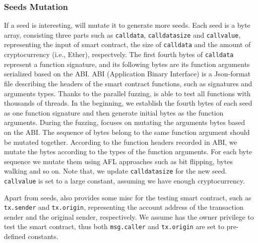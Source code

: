 \subsubsection{Seeds Mutation}
\label{design:mutation}
If a seed is interesting, {\runner} will mutate it to generate more seeds. 
Each seed is a byte array, consisting three parts such as \texttt{calldata}, \texttt{calldatasize} and \texttt{callvalue}, representing the input of smart contract, the size of \texttt{calldata} and the amount of cryptocurrency (i.e., Ether), respectvely.  
%
The first fourth bytes of \texttt{calldata} represent a function signature, and its following bytes are its function arguments serialized based on the ABI.
ABI (Application Binary Interface) is a Json-format file describing the headers of the smart contract functions, such as signatures and arguments types. 
Thanks to the parallel fuzzing, {\runner} is able to test all functions with thousands of threads. 
In the beginning, we establish the fourth bytes of each seed as one function signature and then generate initial bytes as the function arguments.
During the fuzzing, {\runner} focuses on mutating the arguments bytes based on the ABI.
The sequence of bytes belong to the same function argument should be mutated together.
%
%
%
%
%
According to the function headers recorded in ABI, we mutate the bytes according to the types of the function arguments. 
For each byte sequence we mutate them using AFL\cite{afl} approaches such as bit flipping, bytes walking and so on.
Note that, we update \texttt{calldatasize} for the new seed. \texttt{callvalue} is set to a large constant, assuming we have enough cryptocurrency. 

Apart from seeds, {\runner} also provides some misc for the testing smart contract, such as  \texttt{tx.sender} and \texttt{tx.origin}, representing the account address of the transaction sender and the original sender, respectively. 
We assume {\tool} has the owner privilege to test the smart contract, thus both \texttt{msg.caller} and \texttt{tx.origin} are set to pre-defined constants.
    

